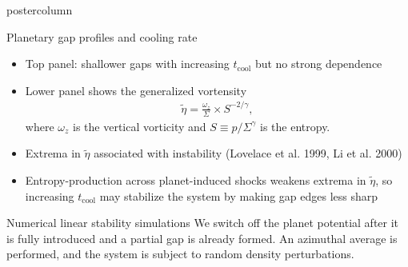 \documentclass[final,hyperref={pdfpagelabels=false}]{beamer}
\begin{document}
\begin{frame}
\begin{columns}
\begin{column}{.49\textwidth}
\begin{beamercolorbox}[center,wd=\textwidth]{postercolumn}
\begin{minipage}[T]{.95\textwidth}
{\begin{block}{{\Large Planetary gap profiles and cooling
              rate}}
\begin{minipage}[t]{0.49\textwidth}
\begin{figure}
            \end{figure}
          \end{minipage}
          \begin{minipage}[t]{0.49\textwidth}
            \begin{itemize}
            \item Top panel: shallower gaps with increasing $t_\mathrm{cool}$ 
              but no strong dependence 
            \item Lower panel shows the generalized vortensity
              \begin{align*}
                \tilde{\eta} = \frac{\omega_z}{\Sigma}\times S^{-2/\gamma},
              \end{align*}
              where $\omega_z$ is the vertical vorticity and $S\equiv
              p/\Sigma^\gamma$ is the entropy. 
            \item Extrema in $\tilde{\eta}$ associated with
              instability (Lovelace et al. 1999, Li et al. 2000)
            \item Entropy-production across planet-induced shocks
              weakens extrema in $\tilde{\eta}$, so
             increasing $t_\mathrm{cool}$ may stabilize the
              system by making gap edges less sharp
            \end{itemize}
          \end{minipage}
        \end{block}
        \vfill
        \begin{block}{{\Large Numerical linear stability simulations}}
          \justifying
          We switch off the planet potential after it is fully
          introduced and a partial gap is already formed. An azimuthal
          average is performed, and the system is subject to random
          density perturbations.\\   
          \vspace{-1.5cm}

\end{block}}
\end{minipage}
\end{beamercolorbox}
\end{column}
\end{columns}
\end{frame}
\end{document}
